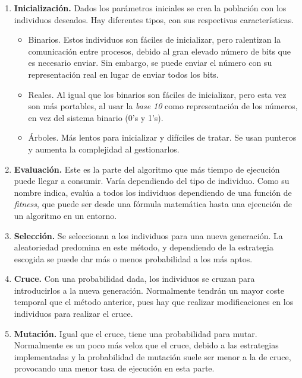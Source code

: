 	\begin{enumerate}
		\item \textbf{Inicialización.} Dados los parámetros iniciales se crea la población con los individuos deseados. Hay diferentes tipos, con sus respectivas características.
		\begin{itemize}
			\item Binarios. Estos individuos son fáciles de inicializar, pero ralentizan la comunicación entre procesos, debido al gran elevado número de bits que es necesario enviar. Sin embargo, se puede enviar el número con su representación real en lugar de enviar todos los bits.
			\item Reales. Al igual que los binarios son fáciles de inicializar, pero esta vez son más portables, al usar la \textit{base 10} como representación de los números, en vez del sistema binario (0's y 1's). 
			\item Árboles. Más lentos para inicializar y difíciles de tratar. Se usan punteros y aumenta la complejidad al gestionarlos.
		\end{itemize}
		
		\item \textbf{Evaluación.} Este es la parte del algoritmo que más tiempo de ejecución puede llegar a consumir. Varía dependiendo del tipo de individuo. Como su nombre indica, evalúa a todos los individuos dependiendo de una función de \textit{fitness}, que puede ser desde una fórmula matemática hasta una ejecución de un algoritmo en un entorno.
		
		\item \textbf{Selección.} Se seleccionan a los individuos para una nueva generación. La aleatoriedad predomina en este método, y dependiendo de la estrategia escogida se puede dar más o menos probabilidad a los más aptos. 
		
		\item \textbf{Cruce.} Con una probabilidad dada, los individuos se cruzan para introducirlos a la nueva generación. Normalmente tendrán un mayor coste temporal que el método anterior, pues hay que realizar modificaciones en los individuos para realizar el cruce. 
		
		\item \textbf{Mutación.} Igual que el cruce, tiene una probabilidad para mutar. Normalmente es un poco más veloz que el cruce, debido a las estrategias implementadas y la probabilidad de mutación suele ser menor a la de cruce, provocando una menor tasa de ejecución en esta parte.
	\end{enumerate}
	
